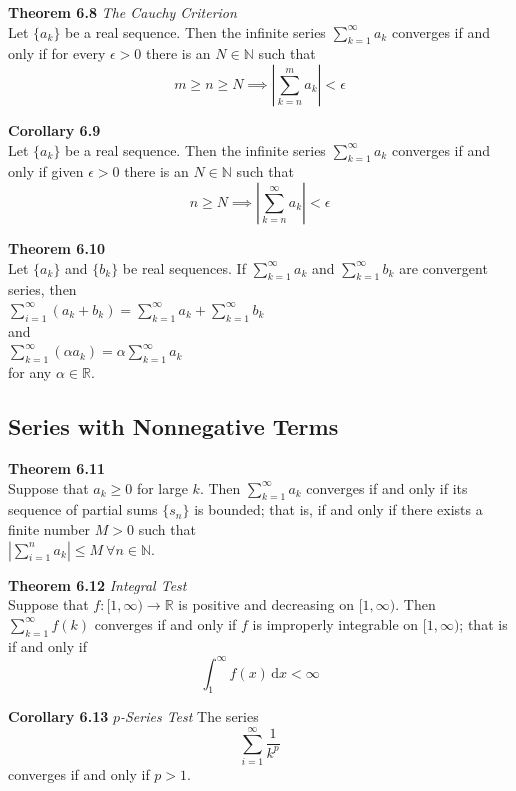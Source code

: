 \documentclass[8pt,landscape]{article}
\begin{document}
\begin{multicols}{3}
    \textbf{Theorem 6.8} \emph{The Cauchy Criterion} \\
    Let $\{a_k\}$ be a real sequence.
    Then the infinite series $\sum_{k=1}^\infty a_k$ converges if and only if for every
    $\epsilon > 0$ there is an $N \in \mathbb{N}$ such that
    \[
        m \geq n \geq N \implies \left| \sum_{k=n}^m a_k \right| < \epsilon
    \]

    \textbf{Corollary 6.9} \\
    Let $\{a_k\}$ be a real sequence.
    Then the infinite series $\sum_{k=1}^\infty a_k$ converges if and only if given
    $\epsilon > 0$ there is an $N \in \mathbb{N}$ such that
    \[
        n \geq N \implies \left| \sum_{k=n}^\infty a_k \right| < \epsilon
    \]

    \textbf{Theorem 6.10} \\
    Let $\{a_k\}$ and $\{b_k\}$ be real sequences.
    If $\sum_{k=1}^\infty a_k$ and $\sum_{k=1}^\infty b_k$ are convergent series, then \\
    $\sum_{i=1}^\infty (a_k + b_k) = \sum_{k=1}^\infty a_k + \sum_{k=1}^\infty b_k$ \\
    and \\
    $\sum_{k=1}^\infty (\alpha a_k) = \alpha \sum_{k=1}^\infty a_k$ \\
    for any $\alpha \in \mathbb{R}$.

    \subsection{Series with Nonnegative Terms}

    \textbf{Theorem 6.11} \\
    Suppose that $a_k \geq 0$ for large $k$.
    Then $\sum_{k=1}^\infty a_k$ converges if and only if its sequence of partial sums
    $\{s_n\}$ is bounded; that is, if and only if there exists a finite number $M > 0$
    such that \\
    $\left| \sum_{i=1}^n a_k \right| \leq M \ \forall n \in \mathbb{N}$.

    \textbf{Theorem 6.12} \emph{Integral Test} \\
    Suppose that $f : [1, \infty) \to \mathbb{R}$ is positive and decreasing on
    $[1, \infty)$.
    Then $\sum_{k=1}^\infty f(k)$ converges if and only if $f$ is improperly integrable
    on $[1, \infty)$; that is if and only if
    \[
        \int_1^\infty f(x)\, \mathrm{d}x < \infty
    \]

    \textbf{Corollary 6.13} \emph{$p$-Series Test}
    The series
    \[
        \sum_{i=1}^\infty \frac{1}{k^p}
    \]
    converges if and only if $p > 1$.


\end{multicols}
\end{document}
